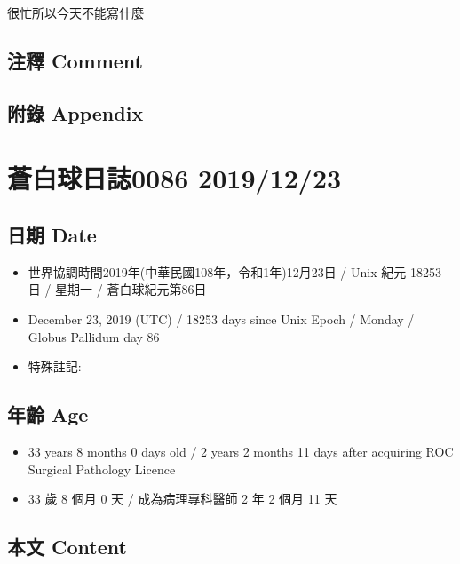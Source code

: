 \documentclass[a5paper, 12pt
]{book}
\providecommand{\tightlist}{%
  \setlength{\itemsep}{0pt}\setlength{\parskip}{0pt}}
\begin{document}
很忙所以今天不能寫什麼

\hypertarget{ux6ce8ux91cb-comment-20}{%
\subsection{注釋 Comment}\label{ux6ce8ux91cb-comment-20}}

\hypertarget{ux9644ux9304-appendix-21}{%
\subsection{附錄 Appendix}\label{ux9644ux9304-appendix-21}}

\hypertarget{ux84bcux767dux7403ux65e5ux8a8c0086-20191223}{%
\section{蒼白球日誌0086
2019/12/23}\label{ux84bcux767dux7403ux65e5ux8a8c0086-20191223}}

\hypertarget{ux65e5ux671f-date-22}{%
\subsection{日期 Date}\label{ux65e5ux671f-date-22}}

\begin{itemize}
\tightlist
\item
  世界協調時間2019年(中華民國108年，令和1年)12月23日 / Unix 紀元 18253
  日 / 星期一 / 蒼白球紀元第86日
\item
  December 23, 2019 (UTC) / 18253 days since Unix Epoch / Monday /
  Globus Pallidum day 86
\item
  特殊註記:
\end{itemize}

\hypertarget{ux5e74ux9f61-age-22}{%
\subsection{年齡 Age}\label{ux5e74ux9f61-age-22}}

\begin{itemize}
\tightlist
\item
  33 years 8 months 0 days old / 2 years 2 months 11 days after
  acquiring ROC Surgical Pathology Licence
\item
  33 歲 8 個月 0 天 / 成為病理專科醫師 2 年 2 個月 11 天
\end{itemize}

\hypertarget{ux672cux6587-content-22}{%
\subsection{本文 Content}\label{ux672cux6587-content-22}}
\end{document}
